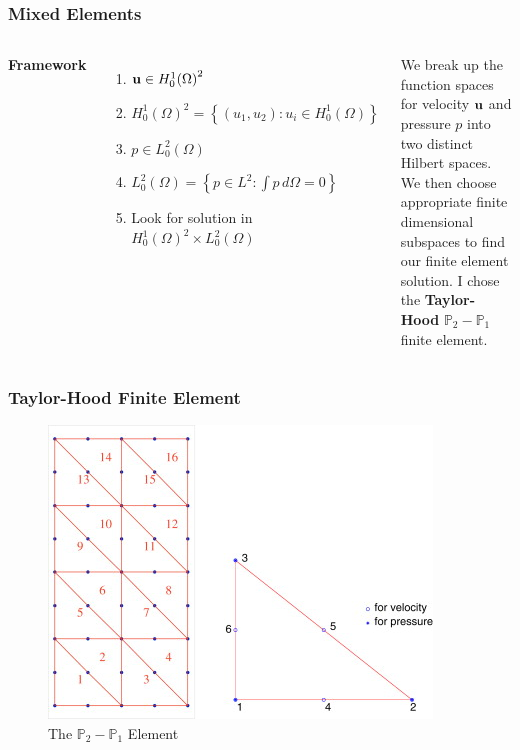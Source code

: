 \documentclass{beamer}
\begin{document}

\begin{frame}
    \frametitle{Mixed Elements}
    \begin{columns}[c] %

        \textbf{Framework}
        \begin{enumerate}
            \item $\mathbf{u} \in H_{0}^{1}{(\Omega)}^2$
            \item $H_{0}^{1}{(\Omega)}^2 = \left\{(u_1, u_2) : u_i \in
                    H_{0}^{1}(\Omega)\right\}$
            \item $p \in L_{0}^{2}(\Omega)$
            \item $L_{0}^{2}(\Omega) = \left\{p \in L^2 : \int p\,d\Omega =
                0\right\}$
            \item Look for solution in $H_{0}^{1}{(\Omega)}^2 \times
                L_{0}^{2}(\Omega)$
        \end{enumerate}

        We break up the function spaces for velocity $\mathbf{u}$ and pressure
        $p$ into two distinct Hilbert spaces. We then choose appropriate finite
        dimensional subspaces to find our finite element solution. I chose the
        \textbf{Taylor-Hood} $\mathbb{P}_2 - \mathbb{P}_1$ finite element.

    \end{columns}
\end{frame}
\begin{frame}
    \frametitle{Taylor-Hood Finite Element}
    \begin{figure}
        \includegraphics[width=0.3\linewidth]{./taylorhood.jpg}
        \caption{The $\mathbb{P}_2 - \mathbb{P}_1$ Element}
    \end{figure}
\end{frame}


\end{document}
